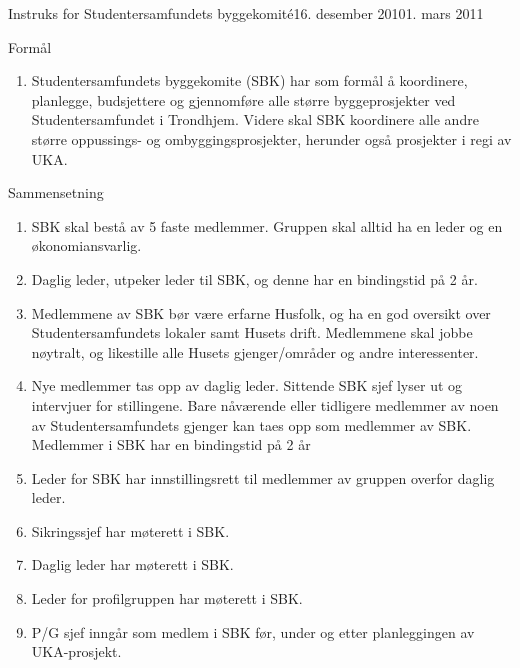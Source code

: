 \begin{instruks}{Instruks for Studentersamfundets byggekomité}{16. desember 2010}{1. mars 2011}

    \begin{instruksledd}{Formål}
        \begin{enumerate}
            \item Studentersamfundets byggekomite (SBK) har som formål å koordinere, planlegge,
                budsjettere og
                gjennomføre alle større byggeprosjekter ved Studentersamfundet i Trondhjem. Videre
                skal SBK koordinere
                alle andre større oppussings- og ombyggingsprosjekter, herunder også prosjekter i
                regi av UKA.
        \end{enumerate}
    \end{instruksledd}

    \begin{instruksledd}{Sammensetning}
        \begin{enumerate}
            \item SBK skal bestå av 5 faste medlemmer. Gruppen skal alltid ha en leder og en
                økonomiansvarlig.
            \item Daglig leder, utpeker leder til SBK, og denne har en bindingstid på 2 år.
            \item Medlemmene av SBK bør være erfarne Husfolk, og ha en god oversikt over
                Studentersamfundets lokaler
                samt Husets drift. Medlemmene skal jobbe nøytralt, og likestille alle Husets
                gjenger/områder og andre
                interessenter.
            \item Nye medlemmer tas opp av daglig leder. Sittende SBK sjef lyser ut og intervjuer
                for stillingene. Bare
                nåværende eller tidligere medlemmer av noen av Studentersamfundets gjenger kan
                taes opp som medlemmer
                av SBK. Medlemmer i SBK har en bindingstid på 2 år
            \item Leder for SBK har innstillingsrett til medlemmer av gruppen overfor daglig
                leder.
            \item Sikringssjef har møterett i SBK.
            \item Daglig leder har møterett i SBK.
            \item Leder for profilgruppen har møterett i SBK.
            \item P/G sjef inngår som medlem i SBK før, under og etter planleggingen av UKA-prosjekt.
        \end{enumerate}
    \end{instruksledd}


\end{instruks}
